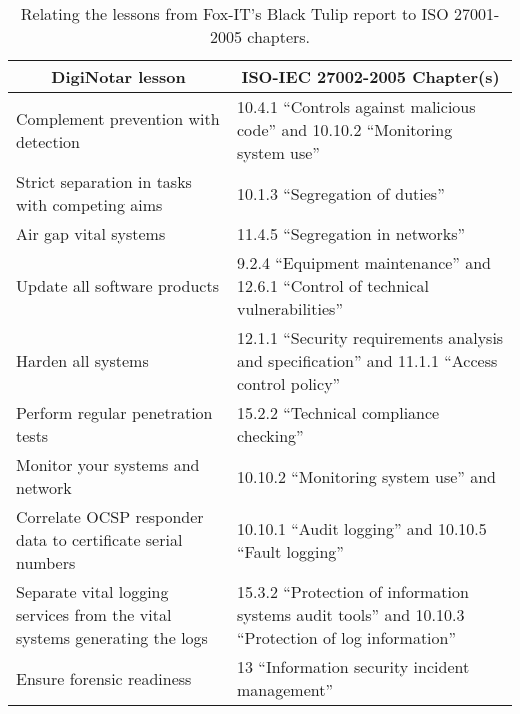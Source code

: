 \documentclass[a4paper]{llncs}
\begin{document}
\begin{table}[h]
\begin{tabular}{| m{6cm} | m{10cm} |}
 \hline
 \multicolumn{1}{|c|}{\textbf{DigiNotar lesson}} & \multicolumn{1}{|c|}{\textbf{ISO-IEC 27002-2005 Chapter(s)}} \\
 \hline
Complement prevention with detection & 10.4.1 “Controls against malicious code” and 10.10.2 “Monitoring system use”\\ 
 \hline
Strict separation in tasks with competing aims & 10.1.3 “Segregation of duties”\\
 \hline
Air gap vital systems & 11.4.5 “Segregation in networks”\\
 \hline
Update all software products & 9.2.4 “Equipment maintenance” and 12.6.1 “Control of technical vulnerabilities” \\  
 \hline
 Harden all systems & 12.1.1 “Security requirements analysis and specification” and 11.1.1 “Access control policy” \\
 \hline
 Perform regular penetration tests & 15.2.2 “Technical compliance checking” \\  
 \hline
 Monitor your systems and network & 10.10.2 “Monitoring system use” and \\  
 \hline
 Correlate OCSP responder data to certificate serial numbers & 10.10.1 “Audit logging” and 10.10.5 “Fault logging” \\  
 \hline
 Separate vital logging services from the vital systems generating the logs & 15.3.2 “Protection of information systems audit tools” and 10.10.3 “Protection of log information” \\  
 \hline
 Ensure forensic readiness & 13 “Information security incident management” \\
 \hline
\end{tabular}
\caption{Relating the lessons from Fox-IT’s Black Tulip report to ISO 27001-2005 chapters.}
\label{table:1}
\end{table}



\end{document}
